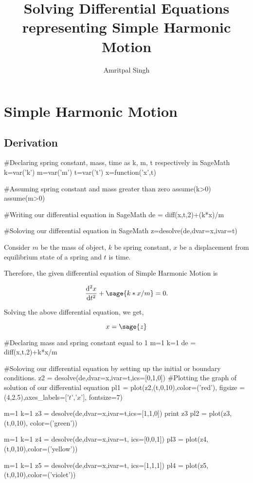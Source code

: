 \documentclass{report}
\title{Solving Differential Equations representing Simple Harmonic Motion}
\author{Amritpal Singh}
\begin{document}
\begin{titlepage}
\maketitle
\tableofcontents
\end{titlepage}


\chapter{Simple Harmonic Motion}
\section{Derivation}
\begin{sagesilent}
#Declaring spring constant, mass, time as k, m, t respectively in SageMath
k=var('k')
m=var('m')
t=var('t')
x=function('x',t)

#Assuming spring constant and mass greater than zero
assume(k>0)
assume(m>0)

#Writing our differential equation in SageMath
de = diff(x,t,2)+(k*x)/m

#Soloving our differential equation in SageMath
z=desolve(de,dvar=x,ivar=t)
\end{sagesilent}

Consider $m$ be the mass of object, $k$ be spring constant, $x$ be a displacement from equilibrium state of a spring and $t$ is time. 

Therefore, the given differential equation of Simple Harmonic Motion is  

\[
  \frac{\mathrm{d}^{2}x}{\mathrm{d}t^{2}} +  \sage{k*x/m} = 0.
\]

Solving the above differential equation, we get,

$$x = \sage{z}$$

\begin{sagesilent}
#Declaring mass and spring constant equal to 1
m=1
k=1
de = diff(x,t,2)+k*x/m

#Soloving our differential equation by setting up the initial or boundary conditions.
z2 = desolve(de,dvar=x,ivar=t,ics=[0,1,0])
#Plotting the graph of solution of our differential equation
pl1 = plot(z2,(t,0,10),color=('red'), figsize = (4,2.5),axes_labels=['$t$','$x$'], fontsize=7)

m=1
k=1
z3 = desolve(de,dvar=x,ivar=t,ics=[1,1,0])
print z3
pl2 = plot(z3,(t,0,10), color=('green'))

m=1
k=1
z4 = desolve(de,dvar=x,ivar=t, ics=[0,0,1])
pl3 = plot(z4,(t,0,10),color=('yellow'))

m=1
k=1
z5 = desolve(de,dvar=x,ivar=t, ics=[1,1,1])
pl4 = plot(z5,(t,0,10),color=('violet'))
\end{sagesilent}
\end{document}
